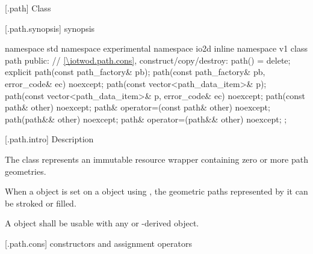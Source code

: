  [\iotwod.path] {Class }

 [\iotwod.path.synopsis] { synopsis}

\begin{codeblock}
namespace std { namespace experimental { namespace io2d { inline namespace v1 {
  class path {
    public:
    // \ref{\iotwod.path.cons}, construct/copy/destroy:
    path() = delete;
    explicit path(const path_factory& pb);
    path(const path_factory& pb, error_code& ec) noexcept;
    path(const vector<path_data_item>& p);
    path(const vector<path_data_item>& p, error_code& ec) noexcept;
    path(const path& other) noexcept;
    path& operator=(const path& other) noexcept;
    path(path&& other) noexcept;
    path& operator=(path&& other) noexcept;
  };
} } } }
\end{codeblock}

 [\iotwod.path.intro] { Description}

\pnum
{}
The  class represents an immutable resource wrapper containing zero or more path geometries.

\pnum
When a  object is set on a  object using 
, the geometric paths represented by it can be 
stroked or filled.

\pnum
A  object shall be usable with any  or -derived object.

 [\iotwod.path.cons] { constructors and assignment operators}

